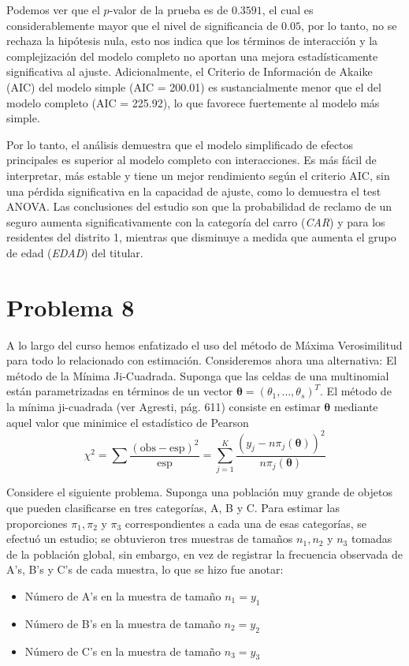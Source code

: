 Podemos ver que el $p$-valor de la prueba es de $0.3591$, el cual es considerablemente mayor que el nivel de significancia de $0.05$, por lo tanto, no se rechaza la hipótesis nula, esto nos indica que los términos de interacción y la complejización del modelo completo no aportan una mejora estadísticamente significativa al ajuste. Adicionalmente, el Criterio de Información de Akaike (AIC) del modelo simple (AIC = 200.01) es sustancialmente menor que el del modelo completo (AIC = 225.92), lo que favorece fuertemente al modelo más simple.

\begin{tcolorbox}
Por lo tanto, el análisis demuestra que el modelo simplificado de efectos principales es superior al modelo completo con interacciones. Es más fácil de interpretar, más estable y tiene un mejor rendimiento según el criterio AIC, sin una pérdida significativa en la capacidad de ajuste, como lo demuestra el test ANOVA. Las conclusiones del estudio son que la probabilidad de reclamo de un seguro aumenta significativamente con la categoría del carro (\textit{CAR}) y para los residentes del distrito 1, mientras que disminuye a medida que aumenta el grupo de edad (\textit{EDAD}) del titular.
\end{tcolorbox}

\newpage

\section*{Problema \textcolor{CIMATRed}{8}}

A lo largo del curso hemos enfatizado el uso del método de Máxima Verosimilitud para todo lo relacionado con estimación. Consideremos ahora una alternativa: El método de la Mínima Ji-Cuadrada. Suponga que las celdas de una multinomial están parametrizadas en términos de un vector $\boldsymbol{\theta} = (\theta_1, \dots, \theta_s)^T$. El método de la mínima ji-cuadrada (ver Agresti, pág. 611) consiste en estimar $\boldsymbol{\theta}$ mediante aquel valor que minimice el estadístico de Pearson
\[
\chi^2 = \sum \frac{(\text{obs} - \text{esp})^2}{\text{esp}} = \sum_{j=1}^K \frac{(y_j - n\pi_j(\boldsymbol{\theta}))^2}{n\pi_j(\boldsymbol{\theta})}
\]

Considere el siguiente problema. Suponga una población muy grande de objetos que pueden clasificarse en tres categorías, A, B y C. Para estimar las proporciones $\pi_1, \pi_2$ y $\pi_3$ correspondientes a cada una de esas categorías, se efectuó un estudio; se obtuvieron tres muestras de tamaños $n_1, n_2$ y $n_3$ tomadas de la población global, sin embargo, en vez de registrar la frecuencia observada de A's, B's y C's de cada muestra, lo que se hizo fue anotar:
\begin{itemize}
    \item Número de A's en la muestra de tamaño $n_1 = y_1$
    \item Número de B's en la muestra de tamaño $n_2 = y_2$
    \item Número de C's en la muestra de tamaño $n_3 = y_3$
\end{itemize}

